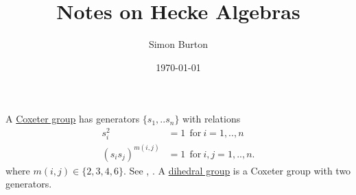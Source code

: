 \documentclass[12pt]{article}
\begin{document}
\title{Notes on Hecke Algebras}

\author{Simon Burton}

\date{\today}


\maketitle




\def\Complex{\mathbb{C}}
\def\C{\mathbb{C}}
\def\R{\mathbb{R}}
\def\Z{\mathbb{Z}}
\def\Ham{H} 
\def\Pauli{\mathcal{P}}
\def\Spec{\mbox{Spec}}
\def\Proveit{{\it (Proof??)}}
\def\GL{\mathrm{GL}}
\def\half{\frac{1}{2}}
\def\Stab{S}
\def\Field{\mathcal{F}}
\def\Defn#1{\underline{#1}}

\newcommand{\ket}[1]{|{#1}\rangle}
\newcommand{\expect}[1]{\langle{#1}\rangle}
\newcommand{\bra}[1]{\langle{#1}|}
\newcommand{\ketbra}[2]{\ket{#1}\!\bra{#2}}
\newcommand{\braket}[2]{\langle{#1}|{#2}\rangle}


%
%

%

A \Defn{Coxeter group}
has generators $\{s_1, .. s_n \}$
with relations
\begin{align*}
    s_i^2 &= 1 \ \ \mbox{for}\ i=1,..,n\\
    (s_i s_j)^{m(i,j)} &= 1\ \ \mbox{for}\ i,j=1,..,n.
\end{align*}
where $m(i,j)\in\{2,3,4,6\}.$
See \cite{Garrett1997}, \cite{Baez2010}.
A \Defn{dihedral group}
is a Coxeter group with two generators.
\end{document}
